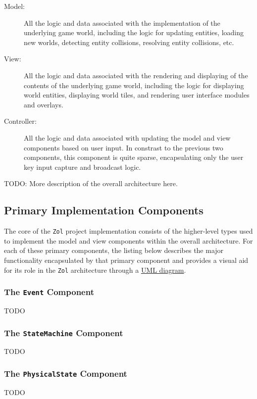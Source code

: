 \documentclass{article}
\newcommand{\classname}[1] {\texttt{#1} }
\newcommand{\projectname}[0] {\texttt{Zol} }
\begin{document}
	\begin{description}
		\item[Model:] All the logic and data associated with the implementation
		of the underlying game world, including the logic for updating entities,
		loading new worlds, detecting entity collisions, resolving entity 
		collisions, etc.
		\item[View:] All the logic and data associated with the rendering and displaying
		of the contents of the underlying game world, including the logic for
		displaying world entities, displaying world tiles, and rendering user
		interface modules and overlays.
		\item[Controller:] All the logic and data associated with updating the
		model and view components based on user input.  In constrast to the
		previous two components, this component is quite sparse, encapsulating
		only the user key input capture and broadcast logic.
	\end{description}

	TODO: More description of the overall architecture here.

		\subsection[Primary Components]{Primary Implementation Components}
		The core of the \projectname project implementation consists of the 
		higher-level types used to implement the model and view components within
		the overall architecture.  For each of these primary components, the listing 
		below describes the major functionality encapsulated by that primary component 
		and provides a visual aid for its role in the \projectname architecture through a 
		\href{http://www.csci.csusb.edu/dick/samples/uml0.html}{UML diagram}.

			\subsubsection[\classname{Event}]{The \classname{Event} Component}
			TODO

			\subsubsection[\classname{StateMachine}]{The \classname{StateMachine} Component}
			TODO

			\subsubsection[\classname{PhysicalState}]{The \classname{PhysicalState} Component}
			TODO
\end{document}
